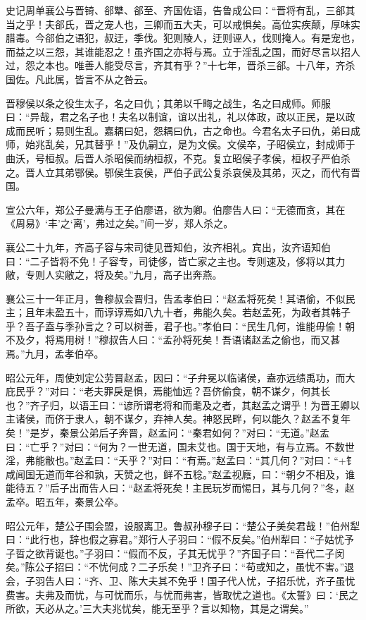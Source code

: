 \documentclass[12pt,UTF8]{ctexbook}
\begin{document}
史记周单襄公与晋锜、郤犨、郤至、齐国佐语，告鲁成公曰：“晋将有乱，三郤其当之乎！夫郤氏，晋之宠人也，三卿而五大夫，可以戒惧矣。高位实疾颠，厚味实腊毒。今郤伯之语犯，叔迂，季伐。犯则陵人，迂则诬人，伐则掩人。有是宠也，而益之以三怨，其谁能忍之！虽齐国之亦将与焉。立于淫乱之国，而好尽言以招人过，怨之本也。唯善人能受尽言，齐其有乎？”十七年，晋杀三郤。十八年，齐杀国佐。凡此属，皆言不从之咎云。



晋穆侯以条之役生太子，名之曰仇；其弟以千畮之战生，名之曰成师。师服曰：“异哉，君之名子也！夫名以制谊，谊以出礼，礼以体政，政以正民，是以政成而民听；易则生乱。嘉耦曰妃，怨耦曰仇，古之命也。今君名太子曰仇，弟曰成师，始兆乱矣，兄其替乎！”及仇嗣立，是为文侯。文侯卒，子昭侯立，封成师于曲沃，号桓叔。后晋人杀昭侯而纳桓叔，不克。复立昭侯子孝侯，桓权子严伯杀之。晋人立其弟鄂侯。鄂侯生哀侯，严伯子武公复杀哀侯及其弟，灭之，而代有晋国。



宣公六年，郑公子曼满与王子伯廖语，欲为卿。伯廖告人曰：“无德而贪，其在《周易》‘丰’之‘离’，弗过之矣。”间一岁，郑人杀之。



襄公二十九年，齐高子容与宋司徒见晋知伯，汝齐相礼。宾出，汝齐语知伯曰：“二子皆将不免！子容专，司徒侈，皆亡家之主也。专则速及，侈将以其力敝，专则人实敝之，将及矣。”九月，高子出奔燕。



襄公三十一年正月，鲁穆叔会晋归，告孟孝伯曰：“赵孟将死矣！其语偷，不似民主；且年未盈五十，而谆谆焉如八九十者，弗能久矣。若赵孟死，为政者其韩子乎？吾子盍与季孙言之？可以树善，君子也。”孝伯曰：“民生几何，谁能毋偷！朝不及夕，将焉用树！”穆叔告人曰：“孟孙将死矣！吾语诸赵孟之偷也，而又甚焉。”九月，孟孝伯卒。



昭公元年，周使刘定公劳晋赵孟，因曰：“子弁冕以临诸侯，盍亦远绩禹功，而大庇民乎？”对曰：“老夫罪戾是惧，焉能恤远？吾侪偷食，朝不谋夕，何其长也？”齐子归，以语王曰：“谚所谓老将和而耄及之者，其赵孟之谓乎！为晋王卿以主诸侯，而侪于隶人，朝不谋夕，弃神人矣。神怒民畔，何以能久？赵孟不复年矣！”是岁，秦景公弟后子奔晋，赵孟问：“秦君如何？”对曰：“无道。”赵孟曰：“亡乎？”对曰：“何为？一世无道，国未艾也。国于天地，有与立焉。不数世淫，弗能敝也。”赵孟曰：“夭乎？”对曰：“有焉。”赵孟曰：“其几何？”对曰：“+钅咸闻国无道而年谷和孰，天赞之也，鲜不五稔。”赵孟视廕，曰：“朝夕不相及，谁能待五？”后子出而告人曰：“赵孟将死矣！主民玩岁而惕日，其与几何？”冬，赵孟卒。昭五年，秦景公卒。



昭公元年，楚公子围会盟，设服离卫。鲁叔孙穆子曰：“楚公子美矣君哉！”伯州犁曰：“此行也，辞也假之寡君。”郑行人子羽曰：“假不反矣。”伯州犁曰：“子姑忧予子晢之欲背诞也。”子羽曰：“假而不反，子其无忧乎？”齐国子曰：“吾代二子闵矣。”陈公子招曰：“不忧何成？二子乐矣！”卫齐子曰：“苟或知之，虽忧不害。”退会，子羽告人曰：“齐、卫、陈大夫其不免乎！国子代人忧，子招乐忧，齐子虽忧费害。夫弗及而忧，与可忧而乐，与忧而弗害，皆取忧之道也。《太誓》曰：‘民之所欲，天必从之。’三大夫兆忧矣，能无至乎？言以知物，其是之谓矣。”
\end{document}
